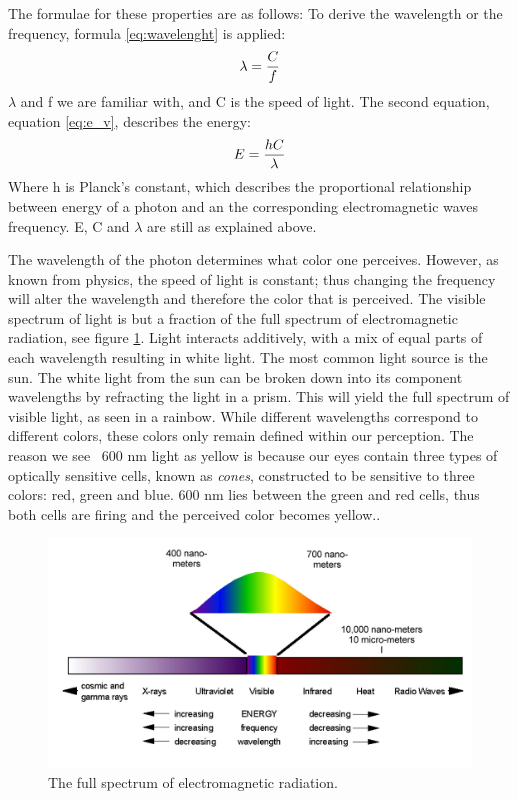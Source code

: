 The formulae for these properties are as follows:
To derive the wavelength or the frequency, formula \ref{eq:wavelenght} is applied:
\begin{align}
\centering 
\lambda = \frac{C}{f}
\label{eq:wavelenght} 
\end{align}
$\lambda$ and f we are familiar with, and C is the speed of light. The second equation, equation \ref{eq:e_v}, describes the energy:
\begin{align}
\centering
E = \frac{hC}{\lambda}
\label{eq:e_v} 
\end{align}
Where h is Planck's constant, which describes the proportional relationship between energy of a photon and an the corresponding electromagnetic waves frequency. E, C and $\lambda$ are still as explained above.

The wavelength of the photon determines what color one perceives. However, as known from physics, the speed of light is constant; thus changing the frequency will alter the wavelength and therefore the color that is perceived. The visible spectrum of light is but a fraction of the full spectrum of electromagnetic radiation, see figure \ref{fig:em_rad}. Light interacts additively, with a mix of equal parts of each wavelength resulting in white light. The most common light source is the sun. The white light from the sun can be broken down into its component wavelengths by refracting the light in a prism. This will yield the full spectrum of visible light, as seen in a rainbow.
While different wavelengths correspond to different colors, these colors only remain defined within our perception. The reason we see ~600 nm light as yellow is because our eyes contain three types of optically sensitive cells, known as \textit{cones}, constructed to be sensitive to three colors: red, green and blue. 600 nm lies between the green and red cells, thus both cells are firing and the perceived color becomes yellow.\citep{perception_book}.

\begin{figure}[htbp] 
\centering 
\includegraphics[width=1\textwidth]{Pictures/Theory/em_rad.png} 
\caption{The full spectrum of electromagnetic radiation.} 
\label{fig:em_rad} 
\end{figure}

